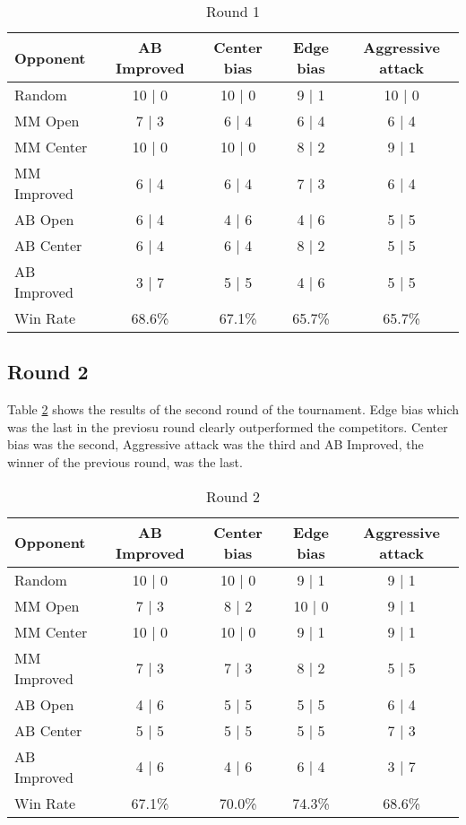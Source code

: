 \documentclass[11pt]{article}
\begin{document}
\begin{table}[h!]
  \centering
  \caption{Round 1}
  \bigskip
  \label{table:round1}
  \begin{tabular}{l|c|c|c|c}
    Opponent & AB Improved & Center bias & Edge bias & Aggressive attack \\
    \hline
    Random & 10 | 0 & 10 | 0 & 9 | 1 & 10 | 0 \\
    MM Open & 7 | 3 & 6 | 4 & 6 | 4 & 6 | 4 \\
    MM Center & 10 | 0 & 10 | 0 & 8 | 2 & 9 | 1 \\
    MM Improved & 6 | 4 & 6 | 4 & 7 | 3 & 6 | 4 \\
    AB Open & 6 | 4 & 4 | 6 & 4 | 6 & 5 | 5 \\
    AB Center & 6 | 4 & 6 | 4 & 8 | 2 & 5 | 5 \\
    AB Improved & 3 | 7 & 5 | 5 & 4 | 6 & 5 | 5 \\
    \hline
    Win Rate & 68.6\% & 67.1\% & 65.7\% & 65.7\%
  \end{tabular}
\end{table}


\subsection{Round 2}

Table \ref{table:round2} shows the results of the second round of the tournament. Edge bias which was the last in the previosu round clearly outperformed the competitors. Center bias was the second, Aggressive attack was the third and AB Improved, the winner of the previous round, was the last.

\begin{table}[h!]
  \centering
  \caption{Round 2}
  \bigskip
  \label{table:round2}
  \begin{tabular}{l|c|c|c|c}
    Opponent & AB Improved & Center bias & Edge bias & Aggressive attack \\
    \hline
    Random & 10 | 0 & 10 | 0 & 9 | 1 & 9 | 1 \\
    MM Open & 7 | 3 & 8 | 2 & 10 | 0 & 9 | 1 \\
    MM Center & 10 | 0 & 10 | 0 & 9 | 1 & 9 | 1 \\
    MM Improved & 7 | 3 & 7 | 3 & 8 | 2 & 5 | 5 \\
    AB Open & 4 | 6 & 5 | 5 & 5 | 5 & 6 | 4 \\
    AB Center & 5 | 5 & 5 | 5 & 5 | 5 & 7 | 3 \\
    AB Improved & 4 | 6 & 4 | 6 & 6 | 4 & 3 | 7 \\
    \hline
    Win Rate & 67.1\% & 70.0\% & 74.3\% & 68.6\%
  \end{tabular}
\end{table}
\end{document}
